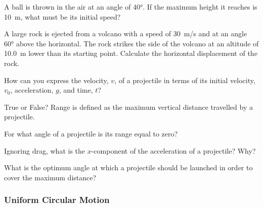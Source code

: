 \documentclass[main-physics.tex]{subfiles}
\begin{document}
\begin{exercise} \label{N0Bwou}
    A ball is thrown in the air at an angle of \ang{40}. If the maximum height it reaches is \SI{10}{m}, what must be its initial speed?
\end{exercise}

\begin{exercise} \label{lhjg95}
    A large rock is ejected from a volcano with a speed of \SI{30}{m/s} and at an angle \ang{60} above the horizontal. The rock strikes the side of the volcano at an altitude of \SI{10.0}{m} lower than its starting point. Calculate the horizontal displacement of the rock.
\end{exercise}

\begin{exercise} \label{wlbvvu}
    How can you express the velocity, $v$, of a projectile in terms of its initial velocity, $v_0$, acceleration, $g$, and time, $t$?
\end{exercise}



\begin{exercise} \label{xj6gln}
    True or False? Range is defined as the maximum vertical distance travelled by a projectile. 
\end{exercise}

\begin{exercise} \label{5wfdN0}
    For what angle of a projectile is its range equal to zero?
\end{exercise}

\begin{exercise} \label{DnqDpu}
    Ignoring drag, what is the $x$-component of the acceleration of a projectile? Why?
\end{exercise}

\begin{exercise} \label{QsBUvP}
    What is the optimum angle at which a projectile should be launched in order to cover the maximum distance?
\end{exercise}

\subsubsection*{Uniform Circular Motion}
\end{document}
